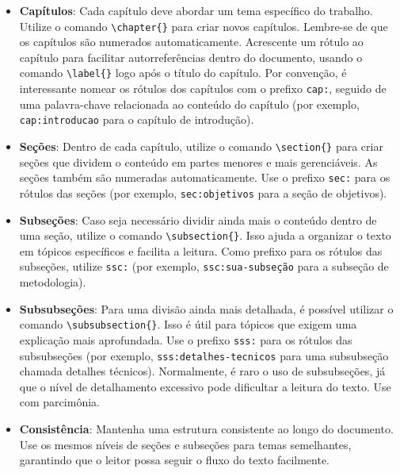 \begin{itemize}
    \item \textbf{Capítulos}: Cada capítulo deve abordar um tema específico do trabalho. Utilize o
          comando \verb|\chapter{}| para criar novos capítulos. Lembre-se de que os capítulos são numerados
          automaticamente. Acrescente um rótulo ao capítulo para facilitar autorreferências dentro do
          documento, usando o comando \verb|\label{}| logo após o título do capítulo. Por convenção, é
          interessante nomear os rótulos dos capítulos com o prefixo \texttt{cap:}, seguido de uma
          palavra-chave relacionada ao conteúdo do capítulo (por exemplo, \texttt{cap:introducao} para o
          capítulo de introdução).
    \item \textbf{Seções}: Dentro de cada capítulo, utilize o comando \verb|\section{}| para criar
          seções que dividem o conteúdo em partes menores e mais gerenciáveis. As seções também são
          numeradas automaticamente. Use o prefixo \texttt{sec:} para os rótulos das seções (por exemplo,
          \texttt{sec:objetivos} para a seção de objetivos).
    \item \textbf{Subseções}: Caso seja necessário dividir ainda mais o conteúdo dentro de uma seção,
          utilize o comando \verb|\subsection{}|. Isso ajuda a organizar o texto em tópicos específicos e
          facilita a leitura. Como prefixo para os rótulos das subseções, utilize \texttt{ssc:} (por exemplo,
          \texttt{ssc:sua-subseção} para a subseção de metodologia).
\item \textbf{Subsubseções}: Para uma divisão ainda mais detalhada, é possível utilizar o comando \linebreak
          \verb|\subsubsection{}|. Isso é útil para tópicos que exigem uma explicação mais aprofundada. Use o
          prefixo \texttt{sss:} para
          os rótulos das subsubseções (por exemplo, \texttt{sss:detalhes-tecnicos} para uma subsubseção
          chamada detalhes técnicos). Normalmente, é raro o uso de subsubseções, já que o nível de detalhamento
          excessivo pode dificultar a leitura do texto. Use com parcimônia.
    \item \textbf{Consistência}: Mantenha uma estrutura consistente ao longo do documento. Use os mesmos
          níveis de seções e subseções para temas semelhantes, garantindo que o leitor possa seguir o fluxo
          do texto facilmente.
\end{itemize}

